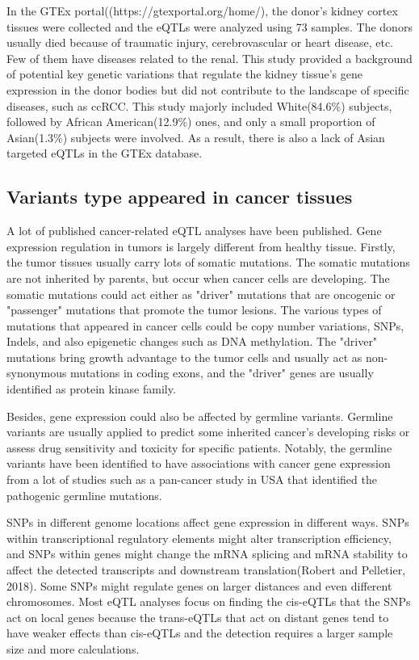 In the GTEx portal((https://gtexportal.org/home/), the donor's kidney cortex tissues were collected and the eQTLs were analyzed using 73 samples. The donors usually died because of traumatic injury, cerebrovascular or heart disease, etc. Few of them have diseases related to the renal. This study provided a background of potential key genetic variations that regulate the kidney tissue's gene expression in the donor bodies but did not contribute to the landscape of specific diseases, such as ccRCC. This study majorly included White(84.6\%) subjects, followed by African American(12.9\%) ones, and only a small proportion of Asian(1.3\%) subjects were involved. As a result, there is also a lack of Asian targeted eQTLs in the GTEx database.

\subsection{Variants type appeared in cancer tissues}
\label{subsec:Variants type appeared in cancer tissues}

A lot of published cancer-related eQTL analyses have been published. Gene expression regulation in tumors is largely different from healthy tissue. Firstly, the tumor tissues usually carry lots of somatic mutations. The somatic mutations are not inherited by parents, but occur when cancer cells are developing. The somatic mutations could act either as "driver" mutations that are oncogenic or "passenger" mutations that promote the tumor lesions. The various types of mutations that appeared in cancer cells could be copy number variations, SNPs, Indels, and also epigenetic changes such as DNA methylation. The "driver" mutations bring growth advantage to the tumor cells and usually act as non-synonymous mutations in coding exons, and the "driver" genes are usually identified as protein kinase family\cite{greenman_patterns_2007}.

Besides, gene expression could also be affected by germline variants. Germline variants are usually applied to predict some inherited cancer's developing risks or assess drug sensitivity and toxicity for specific patients. Notably, the germline variants have been identified to have associations with cancer gene expression from a lot of studies such as a pan-cancer study in USA\cite{huang_pathogenic_2018} that identified the pathogenic germline mutations.

SNPs in different genome locations affect gene expression in different ways. SNPs within transcriptional regulatory elements might alter transcription efficiency, and SNPs within genes might change the mRNA splicing and mRNA stability to affect the detected transcripts and downstream translation(Robert and Pelletier, 2018). Some SNPs might regulate genes on larger distances and even different chromosomes. Most eQTL analyses focus on finding the cis-eQTLs that the SNPs act on local genes because the trans-eQTLs that act on distant genes tend to have weaker effects than cis-eQTLs and the detection requires a larger sample size and more calculations\cite{shan_identification_2019}.


